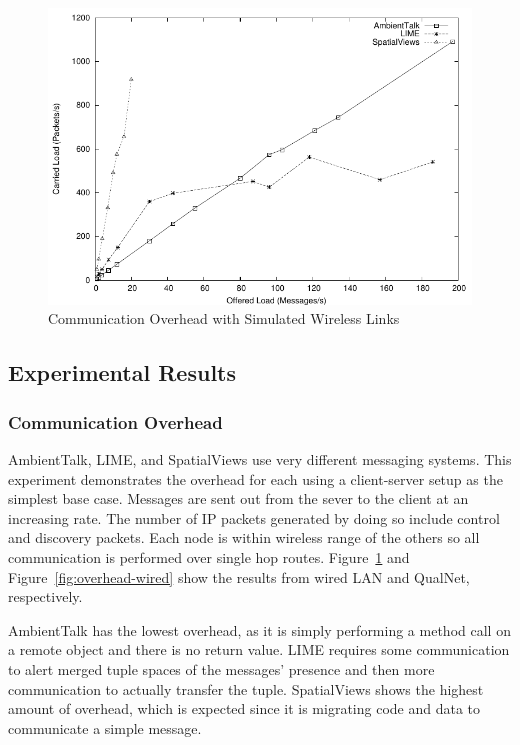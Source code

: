 \begin{figure}
\includegraphics[scale = .70]{figures/overhead-qualnet.pdf}
\caption{Communication Overhead with Simulated Wireless Links}
\label{fig:overhead-qualnet}
\end{figure}

\subsection{Experimental Results}


\subsubsection{Communication Overhead}

AmbientTalk, LIME, and SpatialViews use very different messaging systems. This experiment demonstrates the overhead for each using a client-server setup as the simplest base case. Messages are sent out from the sever to the client at an increasing rate. The number of IP packets generated by doing so include control and discovery packets. Each node is within wireless range of the others so all communication is performed over single hop routes. Figure~\ref{fig:overhead-qualnet} and Figure~\ref{fig:overhead-wired} show the results from wired LAN and QualNet, respectively.

AmbientTalk has the lowest overhead, as it is simply performing a method call on a remote object and there is no return value. LIME requires some communication to alert merged tuple spaces of the messages' presence and then more communication to actually transfer the tuple. SpatialViews shows the highest amount of overhead, which is expected since it is migrating code and data to communicate a simple message. 

